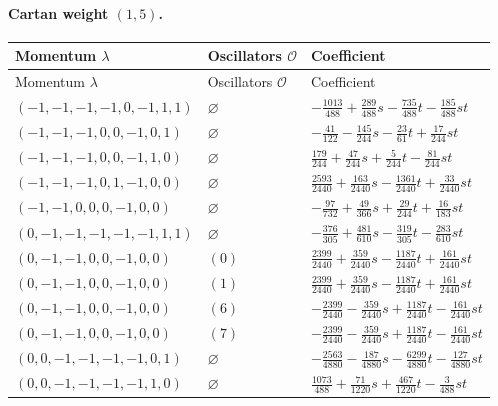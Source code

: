 \paragraph{Cartan weight $(1,5)$.}

\begingroup\scriptsize
\setlength{\tabcolsep}{5pt}
\begin{longtable}{@{}lll@{}}
\toprule
Momentum $\lambda$ & Oscillators $\mathcal O$ & Coefficient\\
\midrule\endfirsthead
\toprule
Momentum $\lambda$ & Oscillators $\mathcal O$ & Coefficient\\
\midrule\endhead
\bottomrule\endfoot
$(-1,-1,-1,-1,0,-1,1,1)$ & $\varnothing$ & $-\frac{1013}{488}+\allowbreak \frac{289}{488}s-\frac{735}{488}t-\frac{185}{488}st$\\
$(-1,-1,-1,0,0,-1,0,1)$ & $\varnothing$ & $-\frac{41}{122}-\frac{145}{244}s-\frac{23}{61}t+\allowbreak \frac{17}{244}st$\\
$(-1,-1,-1,0,0,-1,1,0)$ & $\varnothing$ & $\frac{179}{244}+\allowbreak \frac{47}{244}s+\allowbreak \frac{5}{244}t-\frac{81}{244}st$\\
$(-1,-1,-1,0,1,-1,0,0)$ & $\varnothing$ & $\frac{2593}{2440}+\allowbreak \frac{163}{2440}s-\frac{1361}{2440}t+\allowbreak \frac{33}{2440}st$\\
$(-1,-1,0,0,0,-1,0,0)$ & $\varnothing$ & $-\frac{97}{732}+\allowbreak \frac{49}{366}s+\allowbreak \frac{29}{244}t+\allowbreak \frac{16}{183}st$\\
$(0,-1,-1,-1,-1,-1,1,1)$ & $\varnothing$ & $-\frac{376}{305}+\allowbreak \frac{481}{610}s-\frac{319}{305}t-\frac{283}{610}st$\\
$(0,-1,-1,0,0,-1,0,0)$ & $(0)$ & $\frac{2399}{2440}+\allowbreak \frac{359}{2440}s-\frac{1187}{2440}t+\allowbreak \frac{161}{2440}st$\\
$(0,-1,-1,0,0,-1,0,0)$ & $(1)$ & $\frac{2399}{2440}+\allowbreak \frac{359}{2440}s-\frac{1187}{2440}t+\allowbreak \frac{161}{2440}st$\\
$(0,-1,-1,0,0,-1,0,0)$ & $(6)$ & $-\frac{2399}{2440}-\frac{359}{2440}s+\allowbreak \frac{1187}{2440}t-\frac{161}{2440}st$\\
$(0,-1,-1,0,0,-1,0,0)$ & $(7)$ & $-\frac{2399}{2440}-\frac{359}{2440}s+\allowbreak \frac{1187}{2440}t-\frac{161}{2440}st$\\
$(0,0,-1,-1,-1,-1,0,1)$ & $\varnothing$ & $-\frac{2563}{4880}-\frac{187}{4880}s-\frac{6299}{4880}t-\frac{127}{4880}st$\\
$(0,0,-1,-1,-1,-1,1,0)$ & $\varnothing$ & $\frac{1073}{488}+\allowbreak \frac{71}{1220}s+\allowbreak \frac{467}{1220}t-\frac{3}{488}st$\\

\end{longtable}
